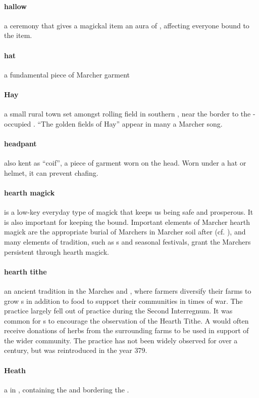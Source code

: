 \paragraph{hallow} a ceremony that gives a magickal item an aura of , affecting everyone bound to the item.
\paragraph{hat} a fundamental piece of Marcher garment 
\paragraph{Hay} a small rural town set amongst rolling field in southern , near the border to the -occupied . “The golden fields of Hay” appear in many a Marcher song.
\paragraph{headpant} also kent as “coif”, a piece of garment worn on the head. Worn under a hat or helmet, it can prevent chafing.
\paragraph{hearth magick} is a low-key everyday type of magick that keeps us being safe and prosperous. It is also important for keeping the  bound. Important elements of Marcher hearth magick are the appropriate burial of Marchers in Marcher soil after  (cf. ), and many elements of tradition, such as s and seasonal festivals, grant the Marchers persistent  through hearth magick.
\paragraph{hearth tithe} an ancient tradition in the Marches and , where farmers diversify their farms to grow s in addition to food to support their communities in times of war. The practice largely fell out of practice during the Second Interregnum. It was common for s to encourage the observation of the Hearth Tithe. A  would often receive donations of herbs from the surrounding farms to be used in support of the wider community. The practice has not been widely observed for over a century, but was reintroduced in the year 379.
\paragraph{Heath} a  in , containing the  and bordering the .
